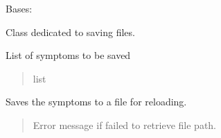 \documentclass[letterpaper,10pt,english]{sphinxmanual}
\begin{document}
\begin{fulllineitems}
\begin{fulllineitems}
\begin{quote}
\begin{description}
\end{description}\end{quote}

\end{fulllineitems}


\end{fulllineitems}


\begin{fulllineitems}
\label{\detokenize{frise:frise.save.save}}
\pysigstartsignatures
{}
\pysigstopsignatures
\sphinxAtStartPar
Bases: 

\sphinxAtStartPar
Class dedicated to saving files.

\begin{fulllineitems}
\label{\detokenize{frise:frise.save.save.symptomes}}
\pysigstartsignatures
{}
\pysigstopsignatures
\sphinxAtStartPar
List of symptoms to be saved
\begin{quote}\begin{description}
\sphinxAtStartPar
list

\end{description}\end{quote}

\end{fulllineitems}


\begin{fulllineitems}
\label{\detokenize{frise:frise.save.save.save}}
\pysigstartsignatures
{}
\pysigstopsignatures
\sphinxAtStartPar
Saves the symptoms to a file for reloading.
\begin{quote}\begin{description}
\sphinxAtStartPar
{} \textendash{} Error message if failed to retrieve file path.


\end{description}
\end{quote}
\end{fulllineitems}
\end{fulllineitems}
\end{document}
